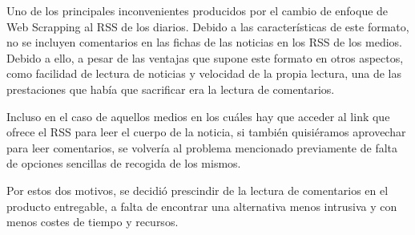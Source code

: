 Uno de los principales inconvenientes producidos por el cambio de enfoque de Web Scrapping al RSS de los diarios. Debido a las características de este formato, no se incluyen comentarios en las fichas de las noticias en los RSS de los medios. Debido a ello, a pesar de las ventajas que supone este formato en otros aspectos, como facilidad de lectura de noticias y velocidad de la propia lectura, una de las prestaciones que había que sacrificar era la lectura de comentarios.

Incluso en el caso de aquellos medios en los cuáles hay que acceder al link que ofrece el RSS para leer el cuerpo de la noticia, si también quisiéramos aprovechar para leer comentarios, se volvería al problema mencionado previamente de falta de opciones sencillas de recogida de los mismos.


Por estos dos motivos, se decidió prescindir de la lectura de comentarios en el producto entregable, a falta de encontrar una alternativa menos intrusiva y con menos costes de tiempo y recursos.